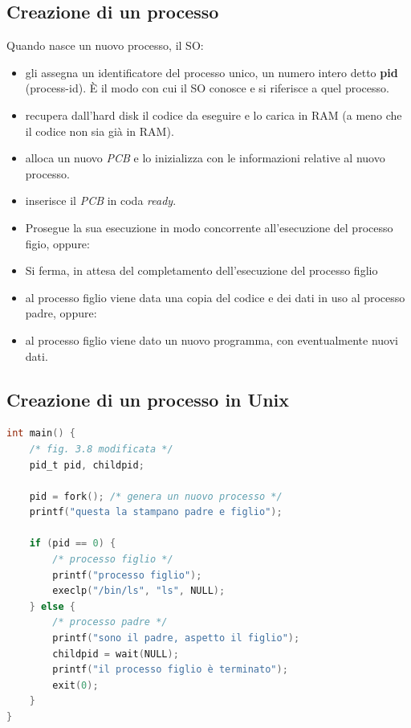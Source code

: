 \subsection{Creazione di un processo}
Quando nasce un nuovo processo, il SO:
\begin{itemize}
    \item gli assegna un identificatore del processo unico, un numero intero detto \textbf{pid} (process-id). È il modo con cui il SO conosce e si riferisce a quel processo.
    \item recupera dall’hard disk il codice da eseguire e lo carica in RAM (a meno che il codice non sia già in RAM).
    \item alloca un nuovo \textit{PCB} e lo inizializza con le informazioni relative al nuovo processo.
    \item inserisce il \textit{PCB} in coda \textit{ready}.
\end{itemize}

\begin{itemize}
    \item Prosegue la sua esecuzione in modo concorrente all'esecuzione del processo figio, oppure:
    \item  Si ferma, in attesa del completamento dell'esecuzione del processo figlio
\end{itemize}
\begin{itemize}
    \item al processo figlio viene data una copia del codice e dei dati in uso al processo padre, oppure:
    \item al processo figlio viene dato un nuovo programma, con eventualmente nuovi dati.
\end{itemize}

\subsection{Creazione di un processo in Unix}
\begin{lstlisting}[language=C]
int main() {
    /* fig. 3.8 modificata */
    pid_t pid, childpid;
    
    pid = fork(); /* genera un nuovo processo */
    printf("questa la stampano padre e figlio");
    
    if (pid == 0) { 
        /* processo figlio */
        printf("processo figlio");
        execlp("/bin/ls", "ls", NULL);
    } else {
        /* processo padre */
        printf("sono il padre, aspetto il figlio");
        childpid = wait(NULL);
        printf("il processo figlio è terminato");
        exit(0);
    }
}
\end{lstlisting}


